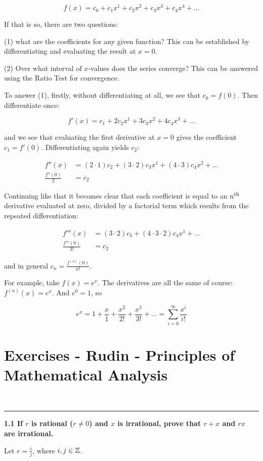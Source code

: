 $$
f(x) = c_0 + c_1x^1 + c_2x^2 + c_3x^3 + c_4x^4 + ...
$$

If that is so, there are two questions:

(1) what are the coefficients for any given function? This can be established
by differentiating and evaluating the result at $x=0$.

(2) Over what interval of $x$-values does the series converge? This can be
answered using the Ratio Test for convergence.

To answer (1), firstly, without differentiating at all, we see that $c_0 = f(0)$. Then differentiate once:

$$
f'(x) = c_1 + 2c_2x^1 + 3c_3x^2 + 4c_4x^3 + ...
$$

and we see that evaluating the first derivative at $x=0$ gives the coefficient
$c_1 = f'(0)$. Differentiating again yields $c_2$:

\begin{align*}
f''(x) &= (2\cdot 1)c_2 + (3\cdot 2)c_3x^1 + (4\cdot 3)c_4x^2 + ... \\
\frac{f''(0)}{2} &= c_2
\end{align*}

Continuing like that it becomes clear that each coefficient is equal to an $n^{\text{th}}$ derivative evaluated at zero, divided by a factorial term which results from the repeated differentiation:

\begin{align*}
f'''(x) &= (3\cdot2)c_3 + (4\cdot3\cdot2)c_4x^1 + ... \\
\frac{f'''(0)}{3!} &= c_2
\end{align*}

and in general $c_n = \frac{f^{(n)}(0)}{n!}$.

For example, take $f(x) = e^x$. The derivatives are all the same of course: $f^{(n)}(x) = e^x$. And $e^0 = 1$, so

$$
e^x = 1 + \frac{x}{1} + \frac{x^2}{2!} + \frac{x^3}{3!} + ... = \sum_{i=0}^\infty \frac{x^i}{i!}
$$
\section{Exercises - Rudin - Principles of Mathematical Analysis}

~\\\hrule
\textbf{1.1 If $r$ is rational ($r \neq 0$) and $x$ is irrational, prove that $r + x$
and $rx$ are irrational.}

Let $r = \frac{i}{j}$, where $i, j \in \mathbb{Z}$.

